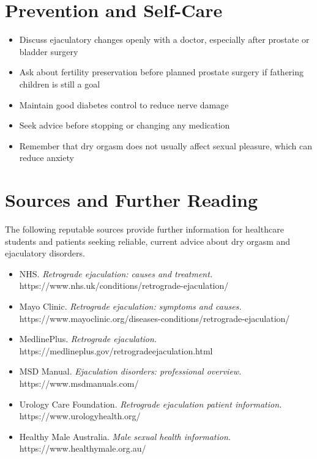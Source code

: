 \section*{Prevention and Self-Care}
\begin{itemize}
    \item Discuss ejaculatory changes openly with a doctor, especially after prostate or bladder surgery
    \item Ask about fertility preservation before planned prostate surgery if fathering children is still a goal
    \item Maintain good diabetes control to reduce nerve damage
    \item Seek advice before stopping or changing any medication
    \item Remember that dry orgasm does not usually affect sexual pleasure, which can reduce anxiety
\end{itemize}

\section*{Sources and Further Reading}
The following reputable sources provide further information for healthcare students and patients seeking reliable, current advice about dry orgasm and ejaculatory disorders.
\begin{itemize}
    \item NHS. \textit{Retrograde ejaculation: causes and treatment.} https://www.nhs.uk/conditions/retrograde-ejaculation/
    \item Mayo Clinic. \textit{Retrograde ejaculation: symptoms and causes.} https://www.mayoclinic.org/diseases-conditions/retrograde-ejaculation/
    \item MedlinePlus. \textit{Retrograde ejaculation.} https://medlineplus.gov/retrogradeejaculation.html
    \item MSD Manual. \textit{Ejaculation disorders: professional overview.} https://www.msdmanuals.com/
    \item Urology Care Foundation. \textit{Retrograde ejaculation patient information.} https://www.urologyhealth.org/
    \item Healthy Male Australia. \textit{Male sexual health information.} https://www.healthymale.org.au/
\end{itemize}
